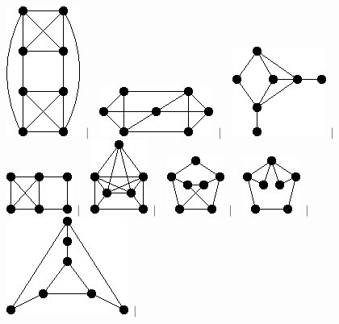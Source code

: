 \documentclass[11pt,paper=b5,footinclude,headinclude]{scrbook} %
\newtheorem{ex}{Vaja\hypertarget{sol:\theex}}[chapter]
\begin{document}
\begin{ex}
\begin{figure}
\includegraphics[scale=0.5]{smallGraphs/g_co-X79.png}$\,\mid\,$\
\includegraphics[scale=0.5]{smallGraphs/g_co-X8.png}$\,\mid\,$\
\includegraphics[scale=0.5]{smallGraphs/g_co-X82.png}$\,\mid\,$\
\includegraphics[scale=0.5]{smallGraphs/g_co-X84.png}$\,\mid\,$\
\includegraphics[scale=0.5]{smallGraphs/g_co-X85.png}$\,\mid\,$\
\includegraphics[scale=0.5]{smallGraphs/g_co-X86.png}$\,\mid\,$\
\includegraphics[scale=0.5]{smallGraphs/g_co-X87.png}$\,\mid\,$\
\includegraphics[scale=0.5]{smallGraphs/g_co-X88.png}$\,\mid\,$\

\end{figure}
\end{ex}
\end{document}
